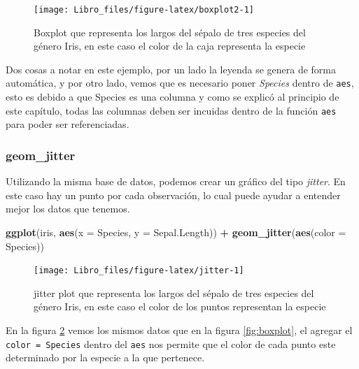 \documentclass[]{book}
\newenvironment{Shaded}{\begin{snugshade}}{\end{snugshade}}
\newcommand{\DataTypeTok}[1]{\textcolor[rgb]{0.13,0.29,0.53}{#1}}
\newcommand{\KeywordTok}[1]{\textcolor[rgb]{0.13,0.29,0.53}{\textbf{#1}}}
\newcommand{\NormalTok}[1]{#1}
\newcommand{\OperatorTok}[1]{\textcolor[rgb]{0.81,0.36,0.00}{\textbf{#1}}}
\newcommand{\StringTok}[1]{\textcolor[rgb]{0.31,0.60,0.02}{#1}}
\begin{document}
\begin{figure}

{\centering \texttt{[image: Libro\_files/figure-latex/boxplot2-1]} 

}

\caption{Boxplot que representa los largos del sépalo de tres especies del género Iris, en este caso el color de la caja representa la especie}\label{fig:boxplot2}
\end{figure}

Dos cosas a notar en este ejemplo, por un lado la leyenda se genera de
forma automática, y por otro lado, vemos que es necesario poner
\emph{Species} dentro de \texttt{aes}, esto es debido a que Species es
una columna y como se explicó al principio de este capítulo, todas las
columnas deben ser incuidas dentro de la función \texttt{aes} para poder
ser referenciadas.

\hypertarget{geom_jitter}{%
\subsubsection{geom\_jitter}\label{geom_jitter}}

Utilizando la misma base de datos, podemos crear un gráfico del tipo
\emph{jitter}. En este caso hay un punto por cada observación, lo cual
puede ayudar a entender mejor los datos que tenemos.

\begin{Shaded}
\begin{Highlighting}[]
\KeywordTok{ggplot}\NormalTok{(iris, }\KeywordTok{aes}\NormalTok{(}\DataTypeTok{x =}\NormalTok{ Species, }\DataTypeTok{y =}\NormalTok{ Sepal.Length)) }\OperatorTok{+}\StringTok{ }\KeywordTok{geom_jitter}\NormalTok{(}\KeywordTok{aes}\NormalTok{(}\DataTypeTok{color =}\NormalTok{ Species))}
\end{Highlighting}
\end{Shaded}

\begin{figure}

{\centering \texttt{[image: Libro\_files/figure-latex/jitter-1]} 

}

\caption{jitter plot que representa los largos del sépalo de tres especies del género Iris, en este caso el color de los puntos representan la especie}\label{fig:jitter}
\end{figure}

En la figura \ref{fig:jitter} vemos los mismos datos que en la figura
\ref{fig:boxplot}, el agregar el \texttt{color\ =\ Species} dentro del
\texttt{aes} nos permite que el color de cada punto este determinado por
la especie a la que pertenece.
\end{document}
